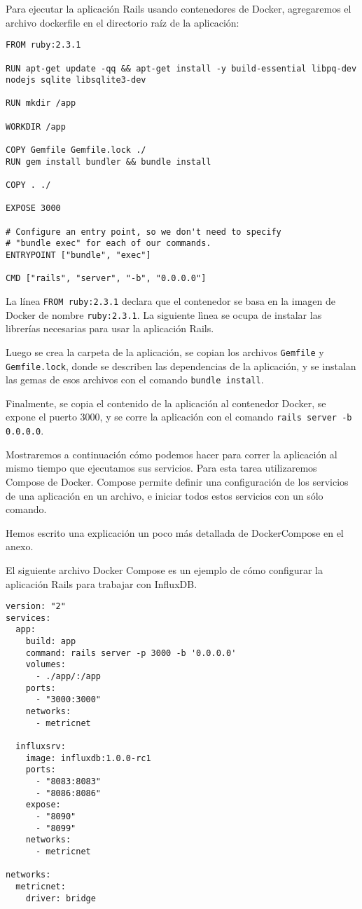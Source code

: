 Para ejecutar la aplicación Rails usando contenedores de Docker, agregaremos el archivo dockerfile en el directorio raíz de la aplicación:

\begin{lstlisting}
FROM ruby:2.3.1

RUN apt-get update -qq && apt-get install -y build-essential libpq-dev nodejs sqlite libsqlite3-dev

RUN mkdir /app

WORKDIR /app

COPY Gemfile Gemfile.lock ./
RUN gem install bundler && bundle install

COPY . ./

EXPOSE 3000

# Configure an entry point, so we don't need to specify 
# "bundle exec" for each of our commands.
ENTRYPOINT ["bundle", "exec"]

CMD ["rails", "server", "-b", "0.0.0.0"]
\end{lstlisting}

La línea \lstinline{FROM ruby:2.3.1} declara que el contenedor se basa en la imagen de Docker de nombre \lstinline{ruby:2.3.1}. La siguiente lìnea se ocupa de instalar las librerías necesarias para usar la aplicación Rails.

Luego se crea la carpeta de la aplicación, se copian los archivos \lstinline{Gemfile} y \lstinline{Gemfile.lock}, donde se describen las dependencias de la aplicación, y se instalan las gemas de esos archivos con el comando \lstinline{bundle install}.

Finalmente, se copia el contenido de la aplicación al contenedor Docker, se expone el puerto 3000, y se corre la aplicación con el comando \lstinline{rails server -b 0.0.0.0}.

Mostraremos a continuación cómo podemos hacer para correr la aplicación al mismo tiempo que ejecutamos sus servicios. Para esta tarea utilizaremos Compose de Docker. Compose permite definir una configuración de los servicios de una aplicación en un archivo, e iniciar todos estos servicios con un sólo comando.

Hemos escrito una explicación un poco más detallada de DockerCompose en el anexo.

El siguiente archivo Docker Compose es un ejemplo de cómo configurar la aplicación Rails para trabajar con InfluxDB.

\begin{lstlisting}
version: "2"
services:
  app:
    build: app
    command: rails server -p 3000 -b '0.0.0.0'
    volumes:
      - ./app/:/app
    ports:
      - "3000:3000"
    networks:
      - metricnet

  influxsrv:
    image: influxdb:1.0.0-rc1
    ports:
      - "8083:8083"
      - "8086:8086"
    expose:
      - "8090"
      - "8099"
    networks:
      - metricnet

networks:
  metricnet:
    driver: bridge
\end{lstlisting}

